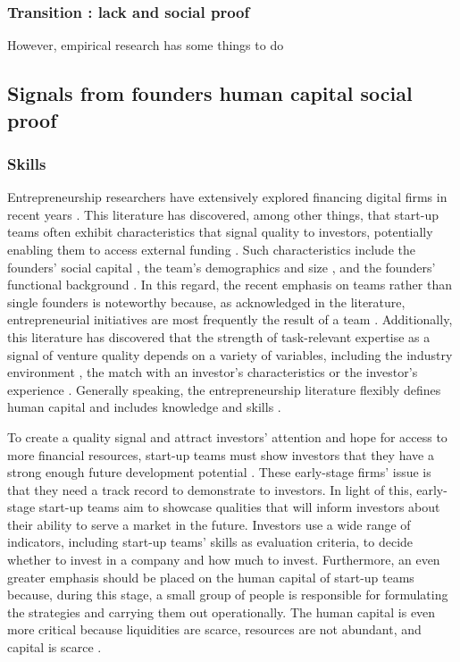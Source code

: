 \documentclass[12pt]{article}
\begin{document}
\subsubsection{Transition : lack and social proof}

However, empirical research has some things to do

\subsection{Signals from founders human capital social proof}

\subsubsection{Skills}

Entrepreneurship researchers have extensively explored financing digital firms in recent years \citep{klein2020start}. This literature has discovered, among other things, that start-up teams often exhibit characteristics that signal quality to investors, potentially enabling them to access external funding \citep{roure1990predictors, reese2020should}. Such characteristics include the founders' social capital \citep{shane2002network}, the team's demographics and size \citep{eisenhardt1990organizational}, and the founders' functional background \citep{ensley1998effect}. In this regard, the recent emphasis on teams rather than single founders is noteworthy because, as acknowledged in the literature, entrepreneurial initiatives are most frequently the result of a team \citep{klotz2014new}. Additionally, this literature has discovered that the strength of task-relevant expertise as a signal of venture quality depends on a variety of variables, including the industry environment \citep{townsend2015turning}, the match with an investor's characteristics \citep{aggarwal2015evaluating} or the investor's experience \citep{franke2008venture}. Generally speaking, the entrepreneurship literature flexibly defines human capital and includes knowledge and skills \citep{ngoasong2017digital, marvel2016human}.

To create a quality signal and attract investors' attention and hope for access to more financial resources, start-up teams must show investors that they have a strong enough future development potential \citep{ko2018signaling}. These early-stage firms' issue is that they need a track record to demonstrate to investors. In light of this, early-stage start-up teams aim to showcase qualities that will inform investors about their ability to serve a market in the future. Investors use a wide range of indicators, including start-up teams' skills as evaluation criteria, to decide whether to invest in a company and how much to invest. Furthermore, an even greater emphasis should be placed on the human capital of start-up teams because, during this stage, a small group of people is responsible for formulating the strategies and carrying them out operationally. The human capital is even more critical because liquidities are scarce, resources are not abundant, and capital is scarce \citep{beckman2007early}.
\end{document}
